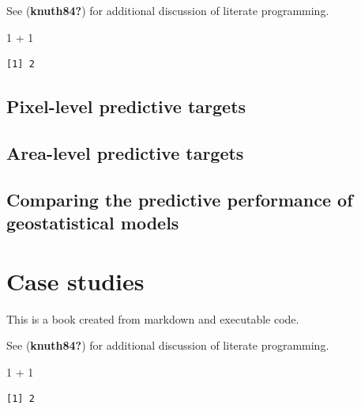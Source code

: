 \documentclass[
  letterpaper,
]{krantz}
\newenvironment{Shaded}{\begin{snugshade}}{\end{snugshade}}
\newcommand{\DecValTok}[1]{\textcolor[rgb]{0.68,0.00,0.00}{#1}}
\newcommand{\SpecialCharTok}[1]{\textcolor[rgb]{0.37,0.37,0.37}{#1}}
\begin{document}
See (\textbf{knuth84?}) for additional discussion of literate
programming.

\begin{Shaded}
\begin{Highlighting}[]
\DecValTok{1} \SpecialCharTok{+} \DecValTok{1}
\end{Highlighting}
\end{Shaded}

\begin{verbatim}
[1] 2
\end{verbatim}

\hypertarget{pixel-level-predictive-targets}{%
\section{Pixel-level predictive
targets}\label{pixel-level-predictive-targets}}

\hypertarget{area-level-predictive-targets}{%
\section{Area-level predictive
targets}\label{area-level-predictive-targets}}

\hypertarget{comparing-the-predictive-performance-of-geostatistical-models}{%
\section{Comparing the predictive performance of geostatistical
models}\label{comparing-the-predictive-performance-of-geostatistical-models}}


\hypertarget{sec-case-studies}{%
\chapter{Case studies}\label{sec-case-studies}}

This is a book created from markdown and executable code.

See (\textbf{knuth84?}) for additional discussion of literate
programming.

\begin{Shaded}
\begin{Highlighting}[]
\DecValTok{1} \SpecialCharTok{+} \DecValTok{1}
\end{Highlighting}
\end{Shaded}

\begin{verbatim}
[1] 2
\end{verbatim}
\end{document}
